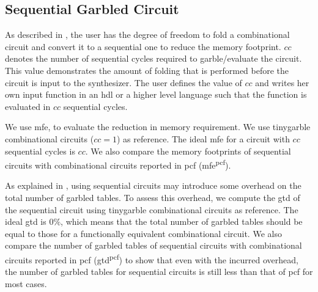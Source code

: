 \subsection{Sequential Garbled Circuit}\label{ssec:eval-tinygarble-seq}
As described in , the user has the degree of freedom to fold a combinational circuit and convert it to a sequential one to reduce the memory footprint.
$cc$ denotes the number of sequential cycles required to garble/evaluate the circuit.
This value demonstrates the amount of folding that is performed before the circuit is input to the synthesizer.
The user defines the value of $cc$ and writes her own input function in an \acrshort{hdl} or a higher level language such that the function is evaluated in $cc$ sequential cycles.

We use \acrfull{mfe}, to evaluate the reduction in memory requirement.
We use \gls{tinygarble} combinational circuits ($cc=1$) as reference.
The ideal \acrshort{mfe} for a circuit with $cc$ sequential cycles is $cc$.
We also compare the memory footprints of sequential circuits with combinational circuits reported in \gls{pcf} (\acrshort{mfe}\textsuperscript{\gls{pcf}}).

As explained in , using sequential circuits may introduce some overhead on the total number of garbled tables.
To assess this overhead, we compute the \acrshort{gtd} of the sequential circuit using \gls{tinygarble} combinational circuits as reference.
The ideal \acrshort{gtd} is $0\%$, which means that the total number of garbled tables should be equal to those for a functionally equivalent combinational circuit.
We also compare the number of garbled tables of sequential circuits with combinational circuits reported in \gls{pcf} (\acrshort{gtd}\textsuperscript{\gls{pcf}}) to show that even with the incurred overhead, the number of garbled tables for sequential circuits is still less than that of \gls{pcf} for most cases.


